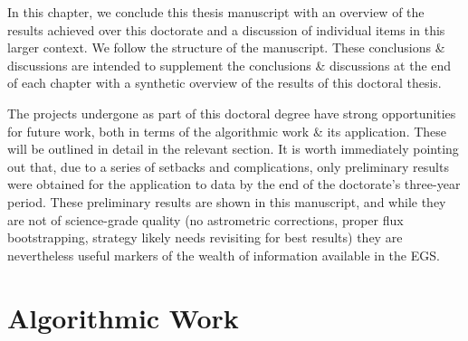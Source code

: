 \minitoc

\pg
In this chapter, we conclude this thesis manuscript with an overview of the results achieved over this doctorate and a discussion of individual items in this larger context. We follow the structure of the manuscript. These conclusions \& discussions are intended to supplement the conclusions \& discussions at the end of each chapter with a synthetic overview of the results of this doctoral thesis.

\pg
The projects undergone as part of this doctoral degree have strong opportunities for future work, both in terms of the algorithmic work \& its application. These will be outlined in detail in the relevant section. It is worth immediately pointing out that, due to a series of setbacks and complications, only preliminary results were obtained for the application to data by the end of the doctorate's three-year period. These preliminary results are shown in this manuscript, and while they are not of science-grade quality (no astrometric corrections, proper flux bootstrapping, strategy likely needs revisiting for best results) they are nevertheless useful markers of the wealth of information available in the EGS. %



\clearpage

\section{Algorithmic Work}

